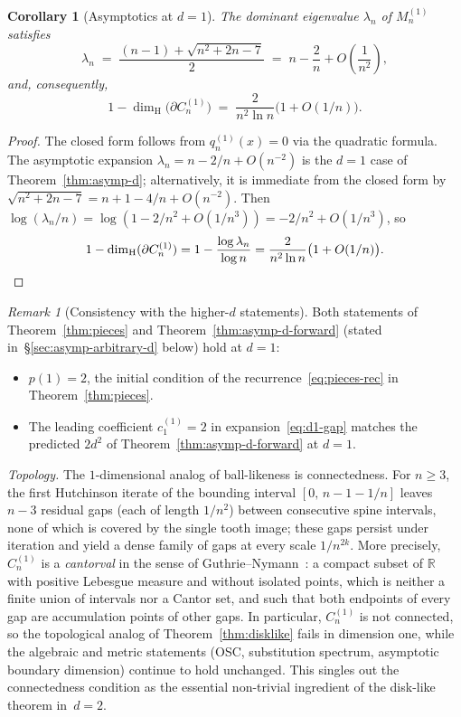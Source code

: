 \documentclass{amsart}
\newtheorem{corollary}[theorem]{Corollary}
\theoremstyle{definition}
\theoremstyle{remark}
\newtheorem{remark}[theorem]{Remark}
\newcommand{\R}{\mathbb{R}}
\newcommand{\dH}{\dim_{\mathrm{H}}}
\begin{document}
\begin{corollary}[Asymptotics at $d=1$]\label{cor:d1-asymp}
The dominant eigenvalue $\lambda_n$ of $M_n^{(1)}$ satisfies
\begin{equation}\label{eq:d1-lambda}
  \lambda_n \;=\; \frac{(n{-}1) + \sqrt{n^2 + 2n - 7}}{2}
            \;=\; n - \frac{2}{n} + O\!\left(\frac{1}{n^2}\right),
\end{equation}
and, consequently,
\begin{equation}\label{eq:d1-gap}
  1 - \dH\bigl(\partial C_n^{(1)}\bigr)
  \;=\; \frac{2}{n^2 \ln n}\bigl(1 + O(1/n)\bigr).
\end{equation}
\end{corollary}

\begin{proof}
The closed form follows from $q_n^{(1)}(x) = 0$ via the quadratic
formula.  The asymptotic expansion $\lambda_n = n - 2/n + O(n^{-2})$
is the $d = 1$ case of Theorem~\ref{thm:asymp-d}; alternatively, it
is immediate from the closed form by $\sqrt{n^2 + 2n - 7} = n + 1 -
4/n + O(n^{-2})$.  Then
$\log(\lambda_n/n) = \log(1 - 2/n^2 + O(1/n^3)) = -2/n^2 + O(1/n^3)$,
so
\[
  1 - \dH(\partial C_n^{(1)})
  = 1 - \frac{\log\lambda_n}{\log n}
  = \frac{2}{n^2 \ln n}\bigl(1 + O(1/n)\bigr). \qedhere
\]
\end{proof}

\begin{remark}[Consistency with the higher-$d$ statements]
Both statements of Theorem~\ref{thm:pieces}
and Theorem~\ref{thm:asymp-d-forward} (stated in~\S\ref{sec:asymp-arbitrary-d} below)
hold at $d = 1$:
\begin{itemize}
\item $p(1) = 2$, the initial condition of the
  recurrence~\eqref{eq:pieces-rec} in
  Theorem~\ref{thm:pieces}.
\item The leading coefficient $c_1^{(1)} = 2$ in
  expansion~\eqref{eq:d1-gap} matches the predicted
  $2d^2$ of Theorem~\ref{thm:asymp-d-forward} at $d = 1$.
\end{itemize}
\end{remark}

\emph{Topology.} The $1$-dimensional analog of ball-likeness is
connectedness.  For $n \ge 3$, the first Hutchinson iterate of
the bounding interval $[0,\, n{-}1{-}1/n]$ leaves $n - 3$
residual gaps (each of length $1/n^2$) between consecutive
spine intervals, none of which is covered by the single tooth
image; these gaps persist under iteration and yield a dense
family of gaps at every scale $1/n^{2k}$.  More precisely,
$C_n^{(1)}$ is a \emph{cantorval} in the sense of
Guthrie--Nymann~\cite{guthrie-nymann}: a compact subset of $\R$
with positive Lebesgue measure and without isolated points,
which is neither a finite union of intervals nor a Cantor set,
and such that both endpoints of every gap are accumulation
points of other gaps.  In particular, $C_n^{(1)}$ is not
connected, so the topological analog of
Theorem~\ref{thm:disklike} fails in dimension one, while the
algebraic and metric statements (OSC, substitution spectrum,
asymptotic boundary dimension) continue to hold unchanged.
This singles out the connectedness condition as the essential
non-trivial ingredient of the disk-like theorem in~$d = 2$.
\end{document}

